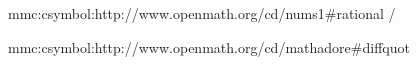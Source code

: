 

\unprotect


\startsetups mmc:csymbol:http://www.openmath.org/cd/nums1\string#rational
    \MMLcreset
    \getXMLstackdata\plustwo/\getXMLstackdata\plusthree
\stopsetups


\startsetups mmc:csymbol:http://www.openmath.org/cd/mathadore\string#diffquot
    \MMLcreset
    \frac {
        \Delta\getXMLstackdata\plustwo
    } {
        \Delta\getXMLstackdata\plusthree
    }
\stopsetups


